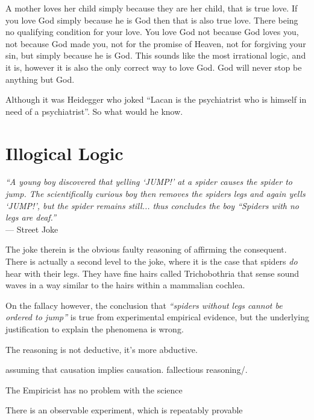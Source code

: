 A mother loves her child simply because they are her child, that is true love. If you love God simply because he is God then that is also true love. There being no qualifying condition for your love. You love God not because God loves you, not because God made you, not for the promise of Heaven, not for forgiving your sin, but simply because he is God. This sounds like the most irrational logic, and it is, however it is also the only correct way to love God. God will never stop be anything but God.

Although it was Heidegger who joked ``Lacan is the psychiatrist who is himself in need of a psychiatrist''. So what would he know.


\newpage
\section{Illogical Logic}

\begin{center}
\textit{``A young boy discovered that yelling `JUMP!' at a spider causes the spider to jump. The scientifically curious boy then removes the spiders legs and again yells `JUMP!', but the spider remains still... thus concludes the boy ``Spiders with no legs are deaf.''}
\\ --- Street Joke
\end{center}

The joke therein is the obvious faulty reasoning of affirming the consequent. There is actually a second level to the joke, where it is the case that spiders \textit{do} hear with their legs. They have fine hairs called Trichobothria that sense sound waves in a way similar to the hairs within a mammalian cochlea. 

On the fallacy however, the conclusion that \textit{``spiders without legs cannot be ordered to jump''} is true from experimental empirical evidence, but the underlying justification to explain the phenomena is wrong.

The reasoning is not deductive, it's more abductive.


assuming that causation implies causation.
fallectious reasoning/.

The Empiricist has no problem with the science

There is an observable experiment, which is repeatably provable



